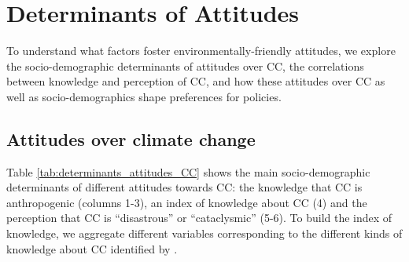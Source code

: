 \documentclass[english,5p,authoryear]{elsarticle}
\begin{document}




\section{Determinants of Attitudes\label{sec:determinants}}

To understand what factors foster environmentally-friendly attitudes, we explore the socio-demographic determinants of attitudes over CC, the correlations between knowledge and perception of CC, and how these attitudes over CC as well as socio-demographics shape preferences for policies. 

    \subsection{Attitudes over climate change}\label{sec:determinants_attitudes_CC}

Table \ref{tab:determinants_attitudes_CC} shows the main socio-demographic determinants of different attitudes towards CC: the knowledge that CC is anthropogenic (columns 1-3), an index of knowledge about CC (4) and the perception that CC is ``disastrous'' or ``cataclysmic'' (5-6). To build the index of knowledge, we aggregate different variables corresponding to the different kinds of knowledge about CC identified by \citet{kiel_einfuhrung_2002} \citep[see also][for a summary]{hoppe_what_2018}. 
\end{document}

